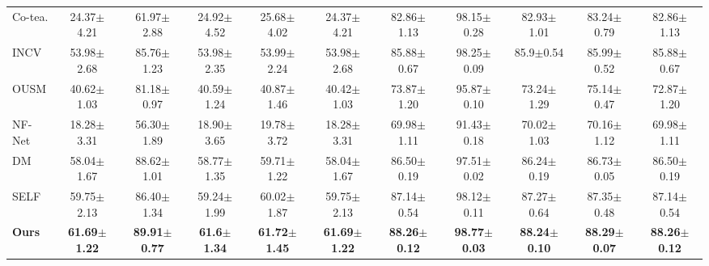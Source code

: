 \begin{table*}[]
\begin{tabular}{@{}lcccccccccc@{}}
Co-tea.                     & 24.37$\pm$4.21          & 61.97$\pm$2.88          & 24.92$\pm$4.52          & 25.68$\pm$4.02          & 24.37$\pm$4.21          & 82.86$\pm$1.13          & 98.15$\pm$0.28          & 82.93$\pm$1.01          & 83.24$\pm$0.79          & 82.86$\pm$1.13          \\
INCV                            & 53.98$\pm$2.68          & 85.76$\pm$1.23          & 53.98$\pm$2.35          & 53.99$\pm$2.24          & 53.98$\pm$2.68          & 85.88$\pm$0.67          & 98.25$\pm$0.09          & 85.9$\pm$0.54           & 85.99$\pm$0.52          & 85.88$\pm$0.67          \\
OUSM                       & 40.62$\pm$1.03          & 81.18$\pm$0.97          & 40.59$\pm$1.24          & 40.87$\pm$1.46          & 40.42$\pm$1.03          & 73.87$\pm$1.20          & 95.87$\pm$0.10          & 73.24$\pm$1.29          & 75.14$\pm$0.47          & 72.87$\pm$1.20          \\
NF-Net                          & 18.28$\pm$3.31          & 56.30$\pm$1.89          & 18.90$\pm$3.65          & 19.78$\pm$3.72          & 18.28$\pm$3.31          & 69.98$\pm$1.11          & 91.43$\pm$0.18          & 70.02$\pm$1.03          & 70.16$\pm$1.12          & 69.98$\pm$1.11          \\
DM                       & 58.04$\pm$1.67          & 88.62$\pm$1.01          & 58.77$\pm$1.35          & 59.71$\pm$1.22          & 58.04$\pm$1.67          & 86.50$\pm$0.19          & 97.51$\pm$0.02          & 86.24$\pm$0.19          & 86.73$\pm$0.05          & 86.50$\pm$0.19          \\
SELF                            & 59.75$\pm$2.13          & 86.40$\pm$1.34          & 59.24$\pm$1.99          & 60.02$\pm$1.87          & 59.75$\pm$2.13          & 87.14$\pm$0.54          & 98.12$\pm$0.11          & 87.27$\pm$0.64          & 87.35$\pm$0.48          & 87.14$\pm$0.54          \\
\textbf{Ours}                   & \textbf{61.69$\pm$1.22} & \textbf{89.91$\pm$0.77} & \textbf{61.6$\pm$1.34}  & \textbf{61.72$\pm$1.45} & \textbf{61.69$\pm$1.22} & \textbf{88.26$\pm$0.12} & \textbf{98.77$\pm$0.03} & \textbf{88.24$\pm$0.10} & \textbf{88.29$\pm$0.07} & \textbf{88.26$\pm$0.12} \\ \bottomrule
\end{tabular}
\end{table*}


